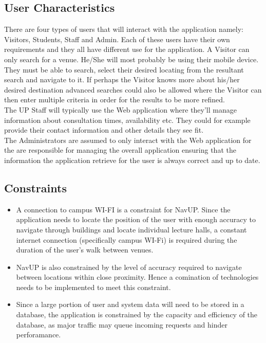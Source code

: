 \documentclass[12pt]{article}
\begin{document}
	\subsection{User Characteristics}
	There are four types of users that will interact with the application namely: Visitors, Students, Staff and Admin. Each of these users have their own requirements and they all have different use for the application. A Visitor can only search for a venue. He/She will most probably be using their mobile device. They must be able to search, select their desired locating from the resultant search and navigate to it. If perhaps the Visitor knows more about his/her desired destination advanced searches could also be allowed where the Visitor can then enter multiple criteria in order for the results to be more refined.\\
	
	The UP Staff will typically use the Web application where they'll manage information about consultation times, availability etc. They could for example provide their contact information and other details they see fit.\\
	
	The Administrators are assumed to only interact with the Web application for the are responsible for managing the overall application ensuring that the information the application retrieve for the user is always correct and up to date.
	\subsection{Constraints}
	\begin{itemize}
		\item A connection to campus WI-FI is a constraint for NavUP. Since the application needs to locate the position of the user with enough accuracy to navigate through buildings and locate individual lecture halls, a constant internet connection (specifically campus WI-Fi) is required during the duration of the user’s walk between venues.
		\item NavUP is also constrained by the level of accuracy required to navigate between locations within close proximity. Hence a comination of technologies needs to be implemented to meet this constraint.
		\item Since a large portion of user and system data will need to be stored in a database, the application is constrained by the capacity and efficiency of the database, as major traffic may queue incoming requests and hinder perforamance.
	\end{itemize}
	
\end{document}

